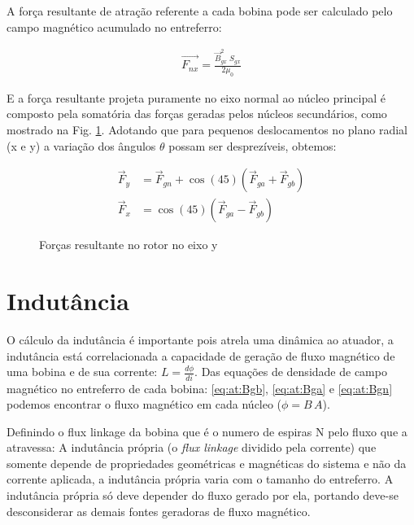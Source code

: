 A força resultante de atração referente  a cada bobina pode ser calculado pelo campo magnético acumulado no entreferro:

\begin{align}
	\vec{F_{nx}} = \frac{\vec{B}_{gx}^2 \; S_{gx}}{2 \mu_0} 
\end{align}

E a força resultante projeta puramente no eixo normal ao núcleo principal é composto pela somatória das forças geradas pelos núcleos secundários, como mostrado na Fig. \ref{Fig:modelo:circuito:ativo:forcas}. Adotando que para pequenos deslocamentos no plano radial (x e y) a variação dos ângulos $\theta$ possam ser desprezíveis, obtemos:

\begin{align}
\vec{F}_y &= \vec{F}_{gn} + \cos(45) (\vec{F}_{ga} + \vec{F}_{gb}) \label{eq:ativo:F:resultante:y} \\
\vec{F}_x &= \cos(45) (\vec{F}_{ga} - \vec{F}_{gb})  \label{eq:ativo:F:resultante:x}
\end{align}

\begin{figure}[!t]
	\centering
	\def\svgwidth{0.8\columnwidth}
	
		\caption{Forças resultante no rotor no eixo y}
		\label{Fig:modelo:circuito:ativo:forcas}
\end{figure} 

\section{Indutância} \label{subsec:at:indutancia}

O cálculo da indutância é importante pois atrela uma dinâmica ao atuador, a indutância está correlacionada a capacidade de geração de fluxo magnético de uma bobina e de sua corrente: $L = \frac {d\phi}{di}$. Das equações de densidade de campo magnético no entreferro de cada bobina: \eqref{eq:at:Bgb},  \eqref{eq:at:Bga} e  \eqref{eq:at:Bgn} podemos encontrar o fluxo magnético em cada núcleo ($\phi = B \, A$).

Definindo o flux linkage da bobina que é o numero de espiras N pelo fluxo que a atravessa: A indutância própria (o  \textit{flux linkage} dividido pela corrente)  que somente depende de propriedades geométricas e magnéticas do sistema e não da corrente aplicada, a indutância própria varia com o tamanho do entreferro. A indutância própria só deve depender do fluxo gerado por ela, portando deve-se desconsiderar as demais fontes geradoras de fluxo magnético.

